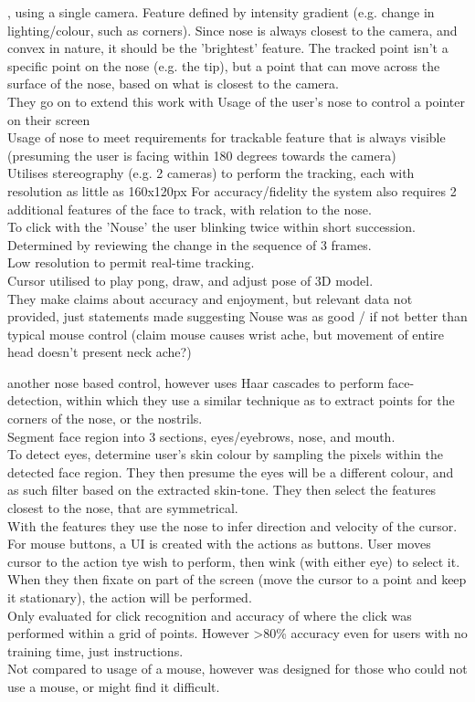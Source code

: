 \cite{gorodnichy2002importance}, using a single camera. Feature defined by intensity gradient (e.g. change in lighting/colour, such as corners). Since nose is always closest to the camera, and convex in nature, it should be the 'brightest' feature. The tracked point isn't a specific point on the nose (e.g. the tip), but a point that can move across the surface of the nose, based on what is closest to the camera.\\
They go on to extend this work with \cite{gorodnichy2004nouse} Usage of the user's nose to control a pointer on their screen\\
Usage of nose to meet requirements for trackable feature that is always visible (presuming the user is facing within 180 degrees towards the camera)\\
Utilises stereography (e.g. 2 cameras) to perform the tracking, each with resolution as little as 160x120px
For accuracy/fidelity the system also requires 2 additional features of the face to track, with relation to the nose.\\
To click with the 'Nouse' the user blinking twice within short succession. Determined by reviewing the change in the sequence of 3 frames.\\
Low resolution to permit real-time tracking.\\
Cursor utilised to play pong, draw, and adjust pose of 3D model.\\
They make claims about accuracy and enjoyment, but relevant data not provided, just statements made suggesting Nouse was as good / if not better than typical mouse control (claim mouse causes wrist ache, but movement of entire head doesn't present neck ache?)

\cite{varona2008hands} another nose based control, however uses Haar cascades to perform face-detection, within which they use a similar technique as \cite{gorodnichy2002importance} to extract points for the corners of the nose, or the nostrils.\\
Segment face region into 3 sections, eyes/eyebrows, nose, and mouth.\\
To detect eyes, determine user's skin colour by sampling the pixels within the detected face region. They then presume the eyes will be a different colour, and as such filter based on the extracted skin-tone. They then select the features closest to the nose, that are symmetrical.\\
With the features they use the nose to infer direction and velocity of the cursor. For mouse buttons, a UI is created with the actions as buttons. User moves cursor to the action tye wish to perform, then wink (with either eye) to select it. When they then fixate on part of the screen (move the cursor to a point and keep it stationary), the action will be performed.\\
Only evaluated for click recognition and accuracy of where the click was performed within a grid of points. However >80\% accuracy even for users with no training time, just instructions.\\
Not compared to usage of a mouse, however was designed for those who could not use a mouse, or might find it difficult.

